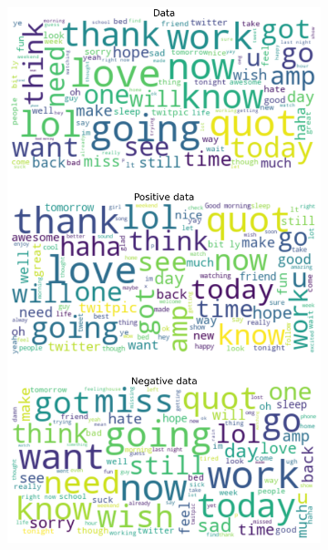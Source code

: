 \documentclass{article}
\begin{document}
\begin{itemize}
  \begin{figure}[H]
    \centering
    \captionsetup{justification=centering}
    \begin{subfigure}[b]{0.24\textwidth}
      \centering
      \includegraphics[width=\textwidth]{chapter-06/section-01-01/09/visualization/1/wordcloud.png}
    \end{subfigure}
    \begin{subfigure}[b]{0.24\textwidth}
      \centering

\end{subfigure}
\end{figure}
\end{itemize}
\end{document}
